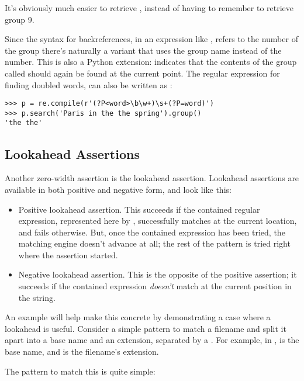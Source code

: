 \documentclass{howto}
\begin{document}
It's obviously much easier to retrieve ,
instead of having to remember to retrieve group 9.

Since the syntax for backreferences, in an expression like
, refers to the number of the group there's
naturally a variant that uses the group name instead of the number.
This is also a Python extension:  indicates
that the contents of the group called  should again be found
at the current point.  The regular expression for finding doubled
words,  can also be written as
:

\begin{verbatim}
>>> p = re.compile(r'(?P<word>\b\w+)\s+(?P=word)')
>>> p.search('Paris in the the spring').group()
'the the'
\end{verbatim}

\subsection{Lookahead Assertions}

Another zero-width assertion is the lookahead assertion.  Lookahead
assertions are available in both positive and negative form, and 
look like this:

\begin{itemize}
\item[\regexp{(?=...)}] Positive lookahead assertion.  This succeeds
if the contained regular expression, represented here by ,
successfully matches at the current location, and fails otherwise.
But, once the contained expression has been tried, the matching engine
doesn't advance at all; the rest of the pattern is tried right where
the assertion started.

\item[\regexp{(?!...)}] Negative lookahead assertion.  This is the
opposite of the positive assertion; it succeeds if the contained expression
\emph{doesn't} match at the current position in the string.
\end{itemize}

An example will help make this concrete by demonstrating a case
where a lookahead is useful.  Consider a simple pattern to match a
filename and split it apart into a base name and an extension,
separated by a .  For example, in , 
is the base name, and  is the filename's extension.  

The pattern to match this is quite simple: 
\end{document}
